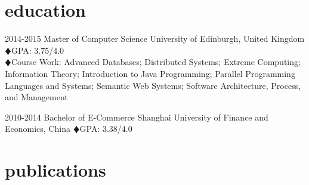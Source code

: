 \documentclass[]{friggeri-cv} %
\begin{document}

\section{education}

\begin{entrylist}
\entry
{2014-2015}
{Master {\normalfont of Computer Science}}
{University of Edinburgh, United Kingdom}
{
{\color{red} $\vardiamondsuit$}GPA: 3.75/4.0\\
{\color{red} $\vardiamondsuit$}Course Work: Advanced Databases; Distributed Systems; Extreme Computing; Information Theory; Introduction to Java Programming; Parallel Programming Languages and Systems; Semantic Web Systems; Software Architecture, Process, and Management
}

\entry
{2010-2014}
{Bachelor {\normalfont of E-Commerce}}
{Shanghai University of Finance and Economics, China}
{
{\color{red} $\vardiamondsuit$}GPA: 3.38/4.0\\
}
\end{entrylist}

%
\section{publications}

\end{document}
